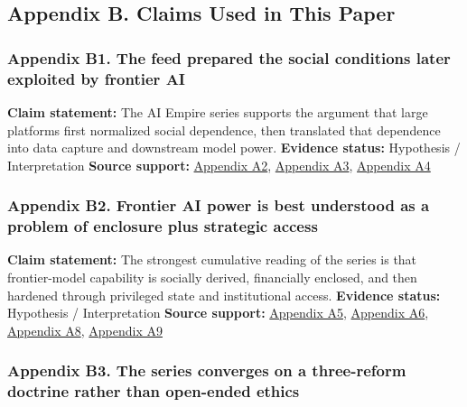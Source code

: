 \documentclass[
  american,
  11pt,
  letterpaper,
]{article}
\begin{document}
\subsection{Appendix B. Claims Used in This
Paper}\label{appendix-b.-claims-used-in-this-paper}

\subsubsection{Appendix B1. The feed prepared the social conditions
later exploited by frontier
AI}\label{appendix-b1.-the-feed-prepared-the-social-conditions-later-exploited-by-frontier-ai}

\textbf{Claim statement:} The AI Empire series supports the argument
that large platforms first normalized social dependence, then translated
that dependence into data capture and downstream model power.
\textbf{Evidence status:} Hypothesis / Interpretation \textbf{Source
support:}
\hyperref[appendix-a2-chapter-01-social-networks-as-infrastructure-for-free-data-capture]{Appendix
A2},
\hyperref[appendix-a3-chapter-02-social-erosion-and-moral-reconfiguration]{Appendix
A3},
\hyperref[appendix-a4-chapter-03-covid-as-a-historical-accelerator]{Appendix
A4}

\subsubsection{Appendix B2. Frontier AI power is best understood as a
problem of enclosure plus strategic
access}\label{appendix-b2.-frontier-ai-power-is-best-understood-as-a-problem-of-enclosure-plus-strategic-access}

\textbf{Claim statement:} The strongest cumulative reading of the series
is that frontier-model capability is socially derived, financially
enclosed, and then hardened through privileged state and institutional
access. \textbf{Evidence status:} Hypothesis / Interpretation
\textbf{Source support:}
\hyperref[appendix-a5-chapter-04-ai-arrives-when-the-human-raw-material-already-exists]{Appendix
A5},
\hyperref[appendix-a6-chapter-05-talent-overhiring-valuation-and-layoffs]{Appendix
A6},
\hyperref[appendix-a8-chapter-07-imperial-control-over-access]{Appendix
A8},
\hyperref[appendix-a9-chapter-08-power-network-legitimacy-and-institutional-capture]{Appendix
A9}

\subsubsection{Appendix B3. The series converges on a three-reform
doctrine rather than open-ended
ethics}\label{appendix-b3.-the-series-converges-on-a-three-reform-doctrine-rather-than-open-ended-ethics}
\end{document}
